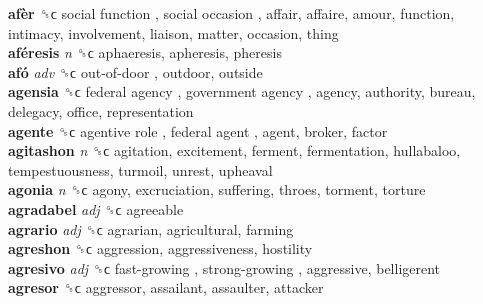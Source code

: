 \textbf{afèr} ␝ϲ   social function ,  social occasion , affair, affaire, amour, function, intimacy, involvement, liaison, matter, occasion, thing  \\
\textbf{aféresis} \emph{n}  ␝ϲ  aphaeresis, apheresis, pheresis  \\
\textbf{afó} \emph{adv}  ␝ϲ   out-of-door , outdoor, outside  \\
\textbf{agensia} ␝ϲ   federal agency ,  government agency , agency, authority, bureau, delegacy, office, representation  \\
\textbf{agente} ␝ϲ   agentive role ,  federal agent , agent, broker, factor  \\
\textbf{agitashon} \emph{n}  ␝ϲ  agitation, excitement, ferment, fermentation, hullabaloo, tempestuousness, turmoil, unrest, upheaval  \\
\textbf{agonia} \emph{n}  ␝ϲ  agony, excruciation, suffering, throes, torment, torture  \\
\textbf{agradabel} \emph{adj}  ␝ϲ  agreeable  \\
\textbf{agrario} \emph{adj}  ␝ϲ  agrarian, agricultural, farming  \\
\textbf{agreshon} ␝ϲ  aggression, aggressiveness, hostility  \\
\textbf{agresivo} \emph{adj}  ␝ϲ   fast-growing ,  strong-growing , aggressive, belligerent  \\
\textbf{agresor} ␝ϲ  aggressor, assailant, assaulter, attacker  \\
